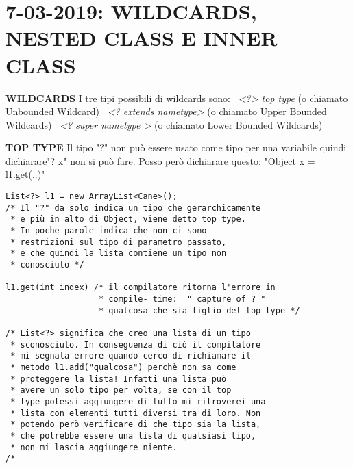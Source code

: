 

\newpage
\section{7-03-2019: WILDCARDS, NESTED CLASS E INNER CLASS}
\textbf{WILDCARDS} \newline
I tre tipi possibili di wildcards sono: \newline
\textbullet\ \textit{<?> top type} (o chiamato Unbounded Wildcard) \newline
\textbullet\ \textit{<? extends nametype>} (o chiamato Upper Bounded Wildcards)\newline
\textbullet\ \textit{<? super nametype >} (o chiamato Lower Bounded Wildcards)\newline

\noindent \textbf{TOP TYPE} \newline
Il tipo "?" non può essere usato come tipo per una variabile quindi dichiarare"? x" non si può fare. Posso però dichiarare questo: "Object x = l1.get(..)"
\begin{lstlisting}
List<?> l1 = new ArrayList<Cane>();
/* Il "?" da solo indica un tipo che gerarchicamente
 * e più in alto di Object, viene detto top type.
 * In poche parole indica che non ci sono 
 * restrizioni sul tipo di parametro passato,
 * e che quindi la lista contiene un tipo non
 * conosciuto */

l1.get(int index) /* il compilatore ritorna l'errore in
				   * compile- time:  " capture of ? " 
				   * qualcosa che sia figlio del top type */
				   
/* List<?> significa che creo una lista di un tipo
 * sconosciuto. In conseguenza di ciò il compilatore 
 * mi segnala errore quando cerco di richiamare il
 * metodo l1.add("qualcosa") perchè non sa come
 * proteggere la lista! Infatti una lista può
 * avere un solo tipo per volta, se con il top
 * type potessi aggiungere di tutto mi ritroverei una
 * lista con elementi tutti diversi tra di loro. Non
 * potendo però verificare di che tipo sia la lista,
 * che potrebbe essere una lista di qualsiasi tipo,
 * non mi lascia aggiungere niente.
/*
			   
\end{lstlisting}


